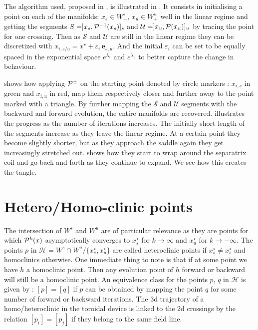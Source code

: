 The algorithm used, proposed in \cite{wei_invariant_2023}, is illustrated in . It consists in initialising a point on each of the manifolds: $x_s \in W^s_+$, $x_u \in W^u_+$ well in the linear regime and getting the segments $S = ]x_s,\mathcal{P}^{-1}(x_s)]_s$ and $\mathcal{U} = ]x_u,\mathcal{P}(x_u)]_u$ by tracing the point for one crossing. Then as $\mathcal{S}$ and $\mathcal{U}$ are still in the linear regime they can be discretized with $x_{i,s/u} = x^\star + \varepsilon_i\,\textbf{e}_{s,u}$. And the initial $\varepsilon_i$ can be set to be equally spaced in the exponential space $e^{\lambda_s}$ and $e^{\lambda_u}$ to better capture the change in behaviour.

 shows how applying $\mathcal{P}^\pm$ on the starting point denoted by circle markers : $x_{i,s}$ in green and $x_{i,u}$ in red, map them respectively closer and further away to the point marked with a triangle. By further mapping the $\mathcal{S}$ and $\mathcal{U}$ segments with the backward and forward evolution, the entire manifolds are recovered.  illustrates the progress as the number of iterations increases. The initially short length of the segments increase as they leave the linear regime. At a certain point they become slightly shorter, but as they approach the saddle again they get increasingly stretched out.  shows how they start to wrap around the separatrix coil and go back and forth as they continue to expand. We see how this creates the tangle.

\section{Hetero/Homo-clinic points}

The intersection of $W^s$ and $W^u$ are of particular relevance as they are points for which $\mathcal{P}^k(x)$ asymptotically converges to $x_s^\star$ for $k \to \infty$ and $x_u^\star$ for $k \to -\infty$. The points $p$ in $\mathcal{H} = W^s \cap W^u / \{x_s^\star, x_u^\star\}$ are called heteroclinic points if $x_s^\star \neq x_s^\star$ and homoclinics otherwise. One immediate thing to note is that if at some point we have $h$ a homoclinic point. Then any evolution point of $h$ forward or backward will still be a homoclinic point. An equivalence class for the points $p$, $q$ in $\mathcal{H}$ is given by : $[p] = [q]$ if $p$ can be obtained by mapping the point $q$ for some number of forward or backward iterations. The 3d trajectory of a homo/heteroclinic in the toroidal device is linked to the 2d crossings by the relation $[p_i] = [p_j]$ if they belong to the same field line.

